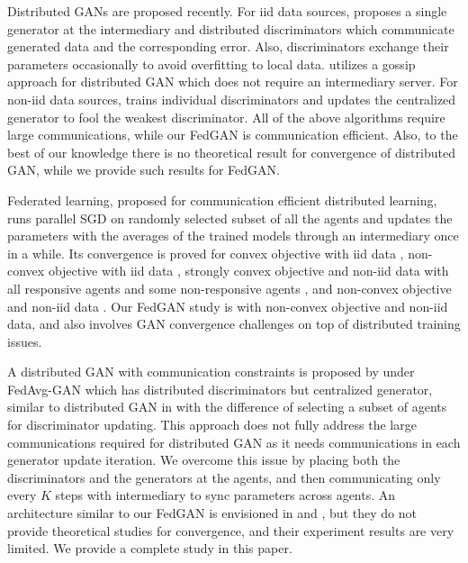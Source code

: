 \documentclass{article}
\begin{document}
Distributed GANs are proposed recently. For iid data sources, \citep{hardy2018md} proposes a single generator at the intermediary and distributed discriminators which communicate generated data and the corresponding error. Also, discriminators exchange their parameters occasionally to avoid overfitting to local data. \citep{hardy2018gossiping} utilizes a gossip approach for distributed GAN which does not require an intermediary server. For non-iid data sources, \citep{yonetani2019decentralized} trains individual discriminators and updates the centralized generator to fool the weakest discriminator. All of the above algorithms require large communications, while our FedGAN is communication efficient. Also, to the best of our knowledge there is no theoretical result for convergence of distributed GAN, while we provide such results for FedGAN.

Federated learning, proposed for communication efficient distributed learning, runs parallel SGD on randomly selected subset of all the agents and updates the parameters with the averages of the trained models through an intermediary once in a while. Its convergence is proved for convex objective with iid data \citep{stich2018local},  non-convex objective with iid data
\citep{wang2018cooperative}, strongly convex objective and non-iid data with all responsive agents
 \citep{wang2019adaptive} and some non-responsive agents  
 \citep{li2019convergence}, and non-convex objective and non-iid data
\citep{yu2019parallel}. Our FedGAN study is with non-convex objective and non-iid data, and also involves GAN convergence challenges on top of distributed training issues.

A distributed GAN with communication constraints is proposed by \cite{augenstein2019generative} under FedAvg-GAN which has distributed discriminators but centralized generator, similar to distributed GAN in \cite{hardy2018md} with the difference of selecting a subset of agents for discriminator updating. This approach does not fully address the large communications required for distributed GAN as it needs communications in each generator update iteration. We overcome this issue by placing both the discriminators and the generators at the agents, and then communicating only every $K$ steps with intermediary to sync parameters across agents. An architecture similar to our FedGAN is envisioned in  \citep{Rajagopal2019FederatedAL} and \citep{hardy2018md}, but they do not provide theoretical studies for convergence, and their experiment results are very limited. We provide  a complete study in this paper.
\end{document}
